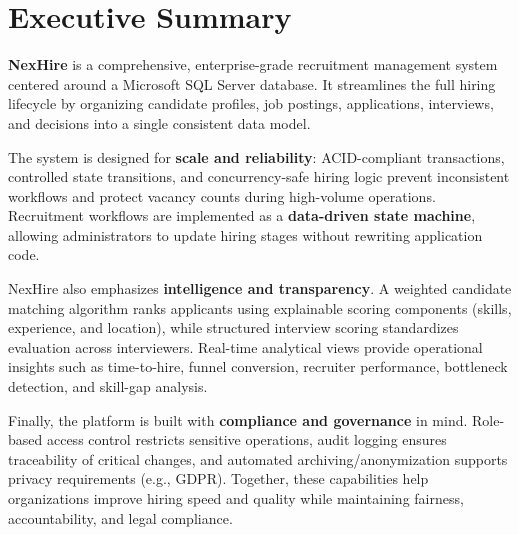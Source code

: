 \documentclass[11pt,a4paper]{article}
\begin{document}
\newpage

\tableofcontents
\newpage



\section{Executive Summary}

\noindent
\textbf{NexHire} is a comprehensive, enterprise-grade recruitment management system centered around a Microsoft SQL Server database. It streamlines the full hiring lifecycle by organizing candidate profiles, job postings, applications, interviews, and decisions into a single consistent data model.

\noindent
The system is designed for \textbf{scale and reliability}: ACID-compliant transactions, controlled state transitions, and concurrency-safe hiring logic prevent inconsistent workflows and protect vacancy counts during high-volume operations. Recruitment workflows are implemented as a \textbf{data-driven state machine}, allowing administrators to update hiring stages without rewriting application code.

\noindent
NexHire also emphasizes \textbf{intelligence and transparency}. A weighted candidate matching algorithm ranks applicants using explainable scoring components (skills, experience, and location), while structured interview scoring standardizes evaluation across interviewers. Real-time analytical views provide operational insights such as time-to-hire, funnel conversion, recruiter performance, bottleneck detection, and skill-gap analysis.

\noindent
Finally, the platform is built with \textbf{compliance and governance} in mind. Role-based access control restricts sensitive operations, audit logging ensures traceability of critical changes, and automated archiving/anonymization supports privacy requirements (e.g., GDPR). Together, these capabilities help organizations improve hiring speed and quality while maintaining fairness, accountability, and legal compliance.
\end{document}
